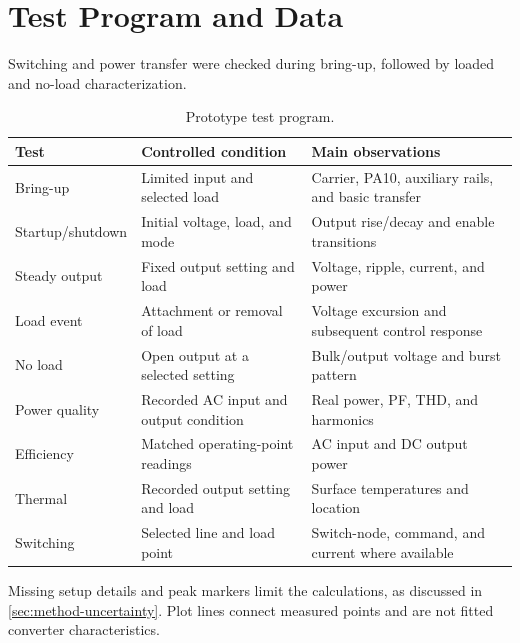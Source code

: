 \section{Test Program and Data}
\label{sec:method-matrix}

Switching and power transfer were checked during bring-up, followed by loaded and
no-load characterization.

\begin{table}[htbp]
\centering
\caption{Prototype test program.}
\label{tab:master-test-matrix}
\begin{tabularx}{\textwidth}{@{}p{}p{}X@{}}
\toprule
Test & Controlled condition & Main observations\\
\midrule
Bring-up & Limited input and selected load & Carrier, PA10, auxiliary rails, and basic transfer\\
Startup/shutdown & Initial voltage, load, and mode & Output rise/decay and enable transitions\\
Steady output & Fixed output setting and load & Voltage, ripple, current, and power\\
Load event & Attachment or removal of load & Voltage excursion and subsequent control response\\
No load & Open output at a selected setting & Bulk/output voltage and burst pattern\\
Power quality & Recorded AC input and output condition & Real power, PF, THD, and harmonics\\
Efficiency & Matched operating-point readings & AC input and DC output power\\
Thermal & Recorded output setting and load & Surface temperatures and location\\
Switching & Selected line and load point & Switch-node, command, and current where available\\
\bottomrule
\end{tabularx}
\end{table}

Missing setup details and peak markers limit the calculations, as discussed in
\cref{sec:method-uncertainty}. Plot lines connect measured points and are not
fitted converter characteristics.
